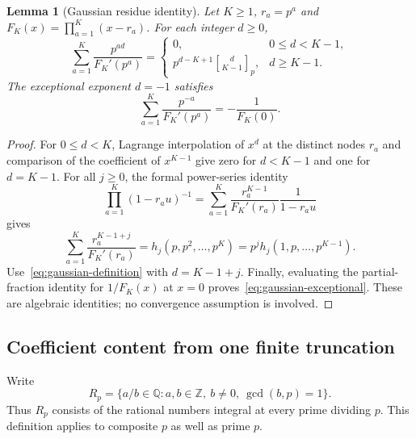 \documentclass[11pt,letterpaper]{article}
\numberwithin{equation}{section}
\newtheorem{lemma}[theorem]{Lemma}
\theoremstyle{remark}
\newcommand{\Z}{\mathbb Z}
\newcommand{\Q}{\mathbb Q}
\newcommand{\gaussbinom}[3]{\genfrac{[}{]}{0pt}{}{#1}{#2}_{#3}}
\begin{document}
\begin{lemma}[Gaussian residue identity]\label{lem:gaussian-residue}
Let $K\ge1$, $r_a=p^a$ and $F_K(x)=\prod_{a=1}^K(x-r_a)$. For each integer $d\ge0$,
\begin{equation}\label{eq:gaussian-residue}
 \sum_{a=1}^K\frac{p^{ad}}{F_K'(p^a)}
 =\begin{cases}
 0,&0\le d<K-1,\\[2pt]
 p^{d-K+1}\gaussbinom{d}{K-1}{p},&d\ge K-1.
 \end{cases}
\end{equation}
The exceptional exponent $d=-1$ satisfies
\begin{equation}\label{eq:gaussian-exceptional}
 \sum_{a=1}^K\frac{p^{-a}}{F_K'(p^a)}=-\frac1{F_K(0)}.
\end{equation}
\end{lemma}
\begin{proof}
For $0\le d<K$, Lagrange interpolation of $x^d$ at the distinct nodes $r_a$ and comparison of the coefficient of $x^{K-1}$ give zero for $d<K-1$ and one for $d=K-1$. For all $j\ge0$, the formal power-series identity
\begin{equation*}
 \prod_{a=1}^K(1-r_a u)^{-1}
 =\sum_{a=1}^K\frac{r_a^{K-1}}{F_K'(r_a)}\frac1{1-r_a u}
\end{equation*}
gives
\begin{equation*}
 \sum_{a=1}^K\frac{r_a^{K-1+j}}{F_K'(r_a)}
 =h_j(p,p^2,\ldots,p^K)
 =p^j h_j(1,p,\ldots,p^{K-1}).
\end{equation*}
Use~\eqref{eq:gaussian-definition} with $d=K-1+j$. Finally, evaluating the partial-fraction identity for $1/F_K(x)$ at $x=0$ proves~\eqref{eq:gaussian-exceptional}. These are algebraic identities; no convergence assumption is involved.
\end{proof}

\subsection{Coefficient content from one finite truncation}

Write
\begin{equation*}
 R_p=\{a/b\in\Q:a,b\in\Z,\ b\ne0,\ \gcd(b,p)=1\}.
\end{equation*}
Thus $R_p$ consists of the rational numbers integral at every prime dividing $p$. This definition applies to composite $p$ as well as prime $p$.
\end{document}
